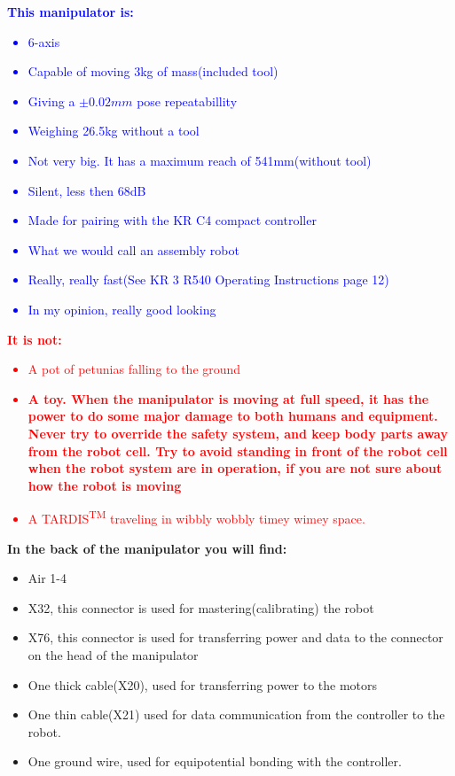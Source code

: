 \documentclass{article}
\begin{document}
   
    \newpage
    \textcolor{blue}{\textbf{This manipulator is:}
    \begin{itemize}
        \item 6-axis
        \item Capable of moving 3kg of mass(included tool)
        \item Giving a $\pm 0.02mm$ pose repeatabillity
        \item Weighing 26.5kg without a tool
        \item Not very big. It has a maximum reach of 541mm(without tool)
        \item Silent, less then 68dB
        \item Made for pairing with the KR C4 compact controller
        \item What we would call an assembly robot
        \item Really, really fast(See KR 3 R540 Operating Instructions page 12)
        \item In my opinion, really good looking
    \end{itemize}}

    \textcolor{red}{\textbf{It is not:}
    \begin{itemize}
        \item A pot of petunias falling to the ground
        \item \textbf{A toy. When the manipulator is moving at full speed, it has the power to do some major damage to both humans and equipment. Never try to override the safety system, and keep body parts away from the robot cell. Try to avoid standing in front of the robot cell when the robot system are in operation, if you are not sure about how the robot is moving}
         \item A TARDIS\textsuperscript{TM} traveling in wibbly wobbly timey wimey space. 
    \end{itemize}}

     \textbf{In the back of the manipulator you will find:}
    \begin{itemize}
        \item Air 1-4
        \item X32, this connector is used for mastering(calibrating) the robot
        \item X76, this connector is used for transferring power and data to the connector on the head of the manipulator
        \item One thick cable(X20), used for transferring power to the motors
        \item One thin cable(X21) used for data communication from the controller to the robot. 
        \item One ground wire, used for equipotential bonding with the controller. 
    \end{itemize}
    
\end{document}
